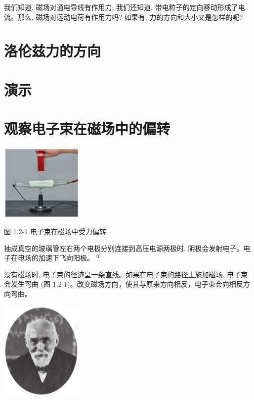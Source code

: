 \documentclass[10pt]{article}
\begin{document}
我们知道, 磁场对通电导线有作用力; 我们还知道, 带电粒子的定向移动形成了电流。那么, 磁场对运动电荷有作用力吗? 如果有, 力的方向和大小又是怎样的呢?

\section*{洛伦兹力的方向}

\section*{演示}

\section*{观察电子束在磁场中的偏转}

\begin{center}
\includegraphics[max width=0.3\textwidth]{images/01910e72-c5b7-7ed5-a6d4-fb3a5faefc32_13_822232.jpg}
\end{center}

图 1.2-1 电子束在磁场中受力偏转

抽成真空的玻璃管左右两个电极分别连接到高压电源两极时, 阴极会发射电子。电子在电场的加速下飞向阳极。 \({}^{\text{①}}\)

没有磁场时, 电子束的径迹呈一条直线。如果在电子束的路径上施加磁场, 电子束会发生弯曲 (图 1.2-1)。改变磁场方向，使其与原来方向相反，电子束会向相反方向弯曲。

\begin{center}
\includegraphics[max width=0.3\textwidth]{images/01910e72-c5b7-7ed5-a6d4-fb3a5faefc32_13_394113.jpg}
\end{center}
\end{document}

